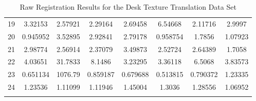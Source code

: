 \begin{center}
\begin{longtable}{cccccccc}
19 & 3.32153 & 2.57921 & 2.29164 & 2.69458 & 6.54668 & 2.11716 & 2.9997\\
20 & 0.945952 & 3.52895 & 2.92841 & 2.79178 & 0.958754 & 1.7856 & 1.07923\\
21 & 2.98774 & 2.56914 & 2.37079 & 3.49873 & 2.52724 & 2.64389 & 1.7058\\
22 & 4.03651 & 31.7833 & 8.1486 & 3.23295 & 3.36118 & 6.5068 & 3.83573\\
23 & 0.651134 & 1076.79 & 0.859187 & 0.679688 & 0.513815 & 0.790372 & 1.23335\\
24 & 1.23536 & 1.11099 & 1.11946 & 1.45004 & 1.3036 & 1.28556 & 1.06952\\
\caption{Raw Registration Results for the Desk Texture Translation Data Set}
\label{tab:desktexturetranslationFULL}
\end{longtable}
\end{center} 


